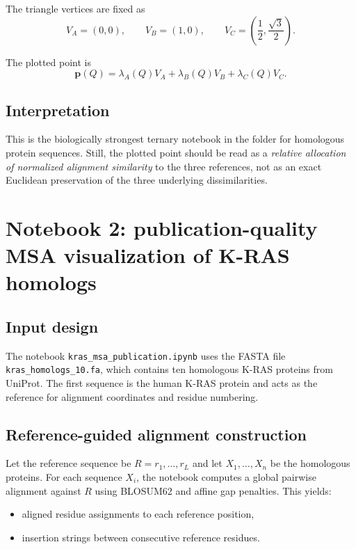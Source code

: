 \documentclass[11pt,a4paper]{article}
\begin{document}
The triangle vertices are fixed as
\[
V_A=(0,0),\qquad
V_B=(1,0),\qquad
V_C=\left(\frac12,\frac{\sqrt3}{2}\right).
\]

The plotted point is
\[
\bm{p}(Q)=\lambda_A(Q)V_A+\lambda_B(Q)V_B+\lambda_C(Q)V_C.
\]

\subsection{Interpretation}

This is the biologically strongest ternary notebook in the folder for homologous protein sequences. Still, the plotted point should be read as a \emph{relative allocation of normalized alignment similarity} to the three references, not as an exact Euclidean preservation of the three underlying dissimilarities.

\section{Notebook 2: publication-quality MSA visualization of K-RAS homologs}

\subsection{Input design}

The notebook \texttt{kras\_msa\_publication.ipynb} uses the FASTA file \texttt{kras\_homologs\_10.fa}, which contains ten homologous K-RAS proteins from UniProt. The first sequence is the human K-RAS protein and acts as the reference for alignment coordinates and residue numbering.

\subsection{Reference-guided alignment construction}

Let the reference sequence be $R=r_1,\dots,r_L$ and let $X_1,\dots,X_n$ be the homologous proteins. For each sequence $X_i$, the notebook computes a global pairwise alignment against $R$ using BLOSUM62 and affine gap penalties. This yields:

\begin{itemize}[leftmargin=*]
\item aligned residue assignments to each reference position,
\item insertion strings between consecutive reference residues.
\end{itemize}
\end{document}
